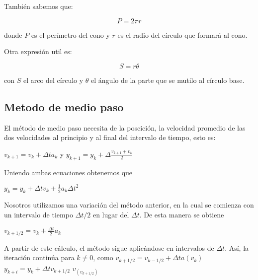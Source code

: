 También sabemos que:

\begin{equation}
    P = 2 \pi r
    \label{Perimetro}
\end{equation}

donde $P$ es el perímetro del cono y $r$
es el radio del círculo que formará al cono.

Otra expresión util es:

\begin{equation}
    S = r \theta
    \label{Arco}
\end{equation}

con $S$ el arco del círculo y $\theta$ el ángulo
de la parte que se mutilo al círculo base.

\subsection{Metodo de medio paso}

El método de medio paso necesita de la poscición, la velocidad
promedio de las dos velocidades al principio y al final del 
intervalo de tiempo, esto es:

$v_{k+1} = v_k + \Delta t a_k$ y $y_{k+1} = y_k + \Delta \frac{v_{k+1}+v_k}{2}$

Uniendo ambas ecuaciones obtenemos que

$y_k = y_k + \Delta t v_k + \frac{1}{2}a_k \Delta t^2$

Nosotros utilizamos una variación del método anterior, en la
cual se comienza con un intervalo de tiempo $\Delta t/2$ en
lugar del $\Delta t$. De esta manera se obtiene

$v_{k+1/2} = v_k + \frac{\Delta t}{2}a_k$

A partir de este cálculo, el método sigue aplicándose
en intervalos de $\Delta t$. Así, la iteración continúa para
$k \neq 0$, como
$v_{k+1/2} = v_{k-1/2} + \Delta ta(v_k)$
$y_{k+i} = y_k + \Delta t v_{k+1/2}$
$v_(v_{k+1/2})$
